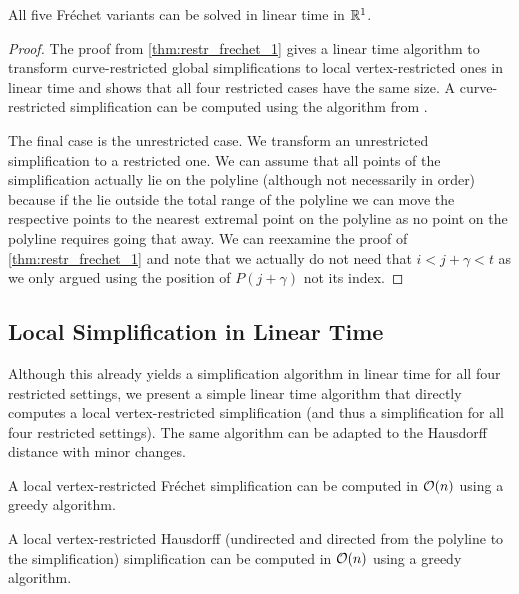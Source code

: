 \begin{corollary}\label{cor:frechet1dall}
	All five Fréchet variants can be solved in linear time in \(\mathbb{R}^1\).
\end{corollary}

\begin{proof}
	The proof from \cref{thm:restr_frechet_1} gives a linear time algorithm to transform curve-restricted global simplifications to local vertex-restricted ones in linear time and shows that all four restricted cases have the same size. A curve-restricted simplification can be computed using the algorithm from \citeauthor{global_curve_simplification}. 

	The final case is the unrestricted case. We transform an unrestricted simplification to a restricted one. We can assume that all points of the simplification actually lie on the polyline (although not necessarily in order) because if the lie outside the total range of the polyline we can move the respective points to the nearest extremal point on the polyline as no point on the polyline requires going that away. We can reexamine the proof of \cref{thm:restr_frechet_1} and note that we actually do not need that \(i < j + \gamma < t\) as we only argued using the position of \(P(j+\gamma)\) not its index.
\end{proof}

\subsection{Local Simplification in Linear Time}
Although this already yields a simplification algorithm in linear time for all four restricted settings, we present a simple linear time algorithm that directly computes a local vertex-restricted simplification (and thus a simplification for all four restricted settings). The same algorithm can be adapted to the Hausdorff distance with minor changes.

\begin{theorem}
	A local vertex-restricted Fréchet simplification can be computed in \(\mathcal{O}(n)\) using a greedy algorithm.

	A local vertex-restricted Hausdorff (undirected and directed from the polyline to the simplification) simplification can be computed in \(\mathcal{O}(n)\) using a greedy algorithm.
\end{theorem}

